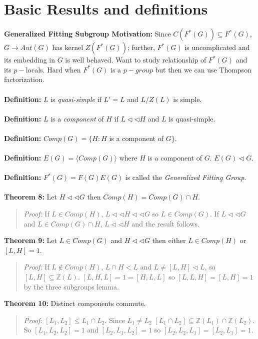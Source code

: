 \section {Basic Results and definitions}
{\bf Generalized Fitting Subgroup Motivation:}
Since $C(F^*(G)) \subseteq F^*(G)$, $G \rightarrow Aut(G)$ has kernel $Z(F^* (G))$; 
further, $F^*(G)$ is uncomplicated and its embedding in $G$ is well behaved.  
Want to study relationship
of $F^*(G)$ and its $p-$locals.  Hard when $F^*(G)$ is a $p-group$ but then we
can use Thompson factorization.  
\\
\\
{\bf Definition:} 
$L$ is \emph{quasi-simple} if $L'=L$ and $L/Z(L)$ is simple.  
\\
\\
{\bf Definition:} 
$L$ is a \emph{ component} of $H$ if
$L \lhd \lhd H$ and $L$ is quasi-simple.
\\
\\
{\bf Definition:} 
$Comp(G)= \{H: H$ is a component of $G \}$.
\\
\\
{\bf Definition:} 
$E(G)= \langle Comp(G) \rangle $ where $H$ is a component of $G$.  $E(G) \lhd G$.
\\
\\
{\bf Definition:} 
$F^*(G)=F(G)E(G)$ is called the \emph{Generalized Fitting Group}.
\\
\\
{\bf Theorem 8:} Let $H \lhd \lhd G$ then $Comp(H)= Comp(G) \cap H$.
\begin{quote}
\emph{Proof:}
If $L \in Comp(H)$, $L \lhd \lhd H \lhd \lhd G$ so $L \in Comp(G)$.  If
$L \lhd \lhd G$ and $L \in Comp(G) \cap H$, $L \lhd \lhd H$ and the result follows.
\end{quote}
{\bf Theorem 9:} Let $L \in Comp(G)$ and $H \lhd \lhd G$ then either $L \in Comp(H)$ or
$[L,H]= 1$.
\begin{quote}
\emph{Proof:}
If $L \notin Comp(H)$, $L \cap H < L$ and $L \ne [L, H] \lhd L$, so 
$[L,H] \subseteq {\mathbb Z}(L)$.  $[L,H,L]=1= [H,L,L]$ so $[L, L, H]= [L, H]=1$ by 
the three subgroups lemma.
\end{quote}
{\bf Theorem 10:} Distinct components commute.
\begin{quote}
\emph{Proof:}
$[L_1, L_2] \le L_1 \cap L_2$.  Since $L_1 \ne L_2$
$[L_1 \cap L_2] \subseteq {\mathbb Z}(L_1) \cap {\mathbb Z}(L_2)$.
So
$[L_1, L_2, L_2] =1$ and
$[L_2, L_1, L_2] =1$ so $[L_2, L_2, L_1]= [L_2, L_1]=1$.
\end{quote}
